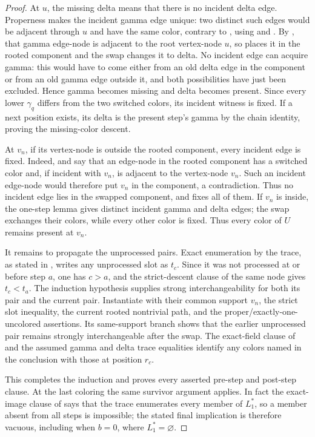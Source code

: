 \begin{proof}
At \(u\), the missing delta means that there is no incident delta edge.
Properness makes the incident gamma edge unique: two distinct such edges
would be adjacent through \(u\) and have the same color, contrary to
, using  and
.  By , that gamma
edge-node is adjacent to the root vertex-node \(u\), so
 places it in the rooted component and the swap
changes it to delta.  No incident edge can acquire gamma: this would have
to come either from an old delta edge in the component or from an old gamma
edge outside it, and both possibilities have just been excluded.  Hence
gamma becomes missing and delta becomes present.  Since every lower
\(\gamma_q\) differs from the two switched colors, its incident witness is
fixed.  If a next position exists, its delta is the present step's gamma by
the chain identity, proving the missing-color descent.

At \(v_n\), if its vertex-node is outside the rooted component, every
incident edge is fixed.  Indeed,  and
 say that an edge-node in the rooted component
has a switched color and, if incident with \(v_n\), is adjacent to the
vertex-node \(v_n\).  Such an incident edge-node would therefore put
\(v_n\) in the component, a contradiction.  Thus no incident edge lies in
the swapped component, and  fixes all of
them.  If \(v_n\) is inside, the one-step lemma gives distinct incident
gamma and delta edges; the swap exchanges their colors, while every other
color is fixed.  Thus every color of \(U\) remains present at \(v_n\).

It remains to propagate the unprocessed pairs.  Exact enumeration by the
trace, as stated in , writes any
unprocessed slot as \(t_c\).  Since it was not processed at or before step
\(a\), one has \(c>a\), and the strict-descent clause of the same node gives
\(t_c<t_a\).  The induction hypothesis supplies strong
interchangeability for both its pair and the current pair.  Instantiate
 with their common support
\(v_n\), the strict slot inequality, the current rooted nontrivial path,
and the proper/exactly-one-uncolored assertions.  Its same-support branch
shows that the earlier unprocessed pair remains strongly interchangeable
after the swap.  The exact-field clause of
 and the assumed gamma and delta
trace equalities identify any colors named in the conclusion with those at
position \(r_c\).

This completes the induction and proves every asserted pre-step and
post-step clause.  At the last coloring the same survivor argument applies.
In fact the exact-image clause of 
says that the trace enumerates every member of \(L_1^*\), so a member absent
from all steps is impossible; the stated final implication is therefore
vacuous, including when \(b=0\), where \(L_1^*=\varnothing\).
\end{proof}
